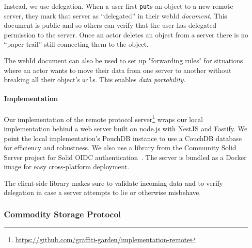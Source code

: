 Instead, we use delegation. When a user first \texttt{put}s an object
to a new remote server, they mark that server as ``delegated'' in their
webId \emph{document}. This document is public and so others can verify
that the user has delegated permission to the server.
Once an actor deletes an object from a server there is no
``paper trail'' still connecting them to the object.

The webId document can also be used to set up "forwarding rules" for
situations where an actor wants to move their data from one server to
another without breaking all their object's \texttt{url}s.
This enables \emph{data portability}.





\paragraph{Implementation}

Our implementation of the remote protocol server\footnote{
    \url{https://github.com/graffiti-garden/implementation-remote}
} wraps our local implementation behind
a web server built on node.js with NestJS and Fastify.
We point the local implementation's PouchDB instance
to use a CouchDB database for efficiency and robustness.
We also use a library from the Community Solid Server project
for Solid OIDC authentication~\cite{communitysolidserver}.
The server is bundled as a Docker image for easy
cross-platform deployment.

The client-side library makes sure to validate
incoming data and to verify delegation in case a server attempts
to lie or otherwise misbehave.

\subsubsection{Commodity Storage Protocol}
\label{above-and-below:commodity-storage-protocol}

